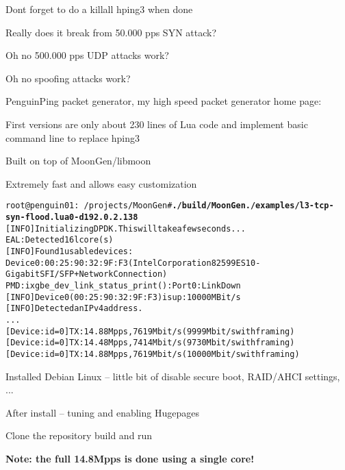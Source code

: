 \documentclass[Screen16to9,17pt]{foils}
\begin{document}
\vskip 1cm
\centerline{Dont forget to do a killall hping3 when done \smiley }




\centerline{Really does it break from 50.000 pps SYN attack?}



\centerline{Oh no 500.000 pps UDP attacks work?}


\centerline{Oh no spoofing attacks work?}




\begin{list2}
\item PenguinPing packet generator, my high speed packet generator
home page: 
\item First versions are only about 230 lines of Lua code and implement basic command line to replace hping3
\item Built on top of MoonGen/libmoon 
\end{list2}

\centerline{Extremely fast and allows easy customization}



\begin{alltt}\footnotesize
root@penguin01:~/projects/MoonGen# {\bfseries ./build/MoonGen ./examples/l3-tcp-syn-flood.lua 0 -d 192.0.2.138}
[INFO]  Initializing DPDK. This will take a few seconds...
EAL: Detected 16 lcore(s)
[INFO]  Found 1 usable devices:
   Device 0: 00:25:90:32:9F:F3 (Intel Corporation 82599ES 10-Gigabit SFI/SFP+ Network Connection)
PMD: ixgbe_dev_link_status_print():  Port 0: Link Down
[INFO]  Device 0 (00:25:90:32:9F:F3) is up: 10000 MBit/s
[INFO]  Detected an IPv4 address.
...
[Device: id=0] TX: 14.88 Mpps, 7619 Mbit/s (9999 Mbit/s with framing)
[Device: id=0] TX: 14.48 Mpps, 7414 Mbit/s (9730 Mbit/s with framing)
[Device: id=0] TX: 14.88 Mpps, 7619 Mbit/s (10000 Mbit/s with framing)
\end{alltt}

\begin{list2}
\item Installed Debian Linux -- little bit of disable secure boot, RAID/AHCI settings, ...
\item After install -- tuning and enabling Hugepages
\item Clone the repository  build and run
\item {\bf Note: the full 14.8Mpps is done using a single core!}
\end{list2}
\end{document}
